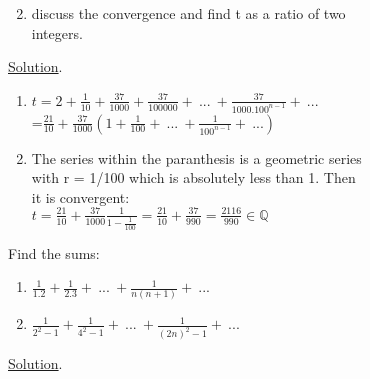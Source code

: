 \documentclass[11pt]{amsbook}
\begin{document}

\begin{enumerate}[label=(\alph*)]
	\setcounter{enumi}{1}

	\item discuss the convergence and find t as a ratio of two\\
	integers.

\end{enumerate}

\underline{Solution}.

\begin{enumerate}[label=(\alph*)]

	\item $t = 2+\frac{1}{10}+\frac{37}{1000}+\frac{37}{100000}+\ ...\ +\frac{37}{1000.100^{n-1}}+\ ...$\\
	=$\frac{21}{10}+\frac{37}{1000}(1+\frac{1}{100}+\ ...\ +\frac{1}{100^{n-1}}+\ ...)$

	\item The series within the paranthesis is a geometric series\\
	with r = 1/100 which is absolutely less than 1. Then\\
	it is convergent:\\
	$t=\frac{21}{10}+\frac{37}{1000}\frac{1}{1-\frac{1}{100}}=\frac{21}{10}+\frac{37}{990}=\frac{2116}{990} \in \mathbb{Q}$

\end{enumerate}

\begin{exmp} Find the sums:\\
\begin{enumerate}[label=(\alph*)]

	\item $\frac{1}{1.2}+\frac{1}{2.3}+\ ...\ +\frac{1}{n(n+1)}+\ ...$
	
	\item $\frac{1}{2^{2}-1}+\frac{1}{4^{2}-1}+\ ...\ +\frac{1}{(2n)^{2}-1}+\ ...$

\end{enumerate}
\end{exmp}

\underline{Solution}.
\end{document}
